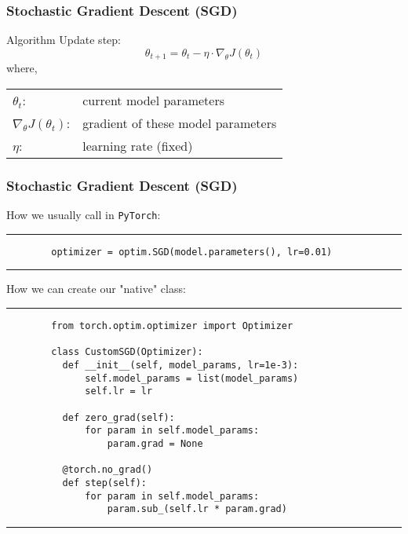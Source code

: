     \begin{frame}
      \frametitle{Stochastic Gradient Descent (SGD)} %
      \begin{block}{Algorithm}
        Update step:
        \begin{equation}
          \theta_{t+1} = \theta_{t} - \eta \cdot \nabla_{\theta}J(\theta_t)
        \end{equation}
        \vskip 0.3cm
        where, \\
        \begin{tabular}{l l}
          $\theta_{t}$: & current model parameters \\
          $\nabla_{\theta}J(\theta_t)$: & gradient of these model parameters \\
          $\eta$: & learning rate (fixed)
        \end{tabular}
        
      \end{block}
    \end{frame}


    \begin{frame}[fragile]
      \frametitle{Stochastic Gradient Descent (SGD)}
      \vspace{0.2cm}
      How we usually call in \verb|PyTorch|:
      \rule{\textwidth}{1pt}
      \scriptsize
      \begin{verbatim}
        optimizer = optim.SGD(model.parameters(), lr=0.01)
      \end{verbatim}
      \rule{\textwidth}{1pt}
      
      \normalsize
      \vspace{0.2cm}
      How we can create our "native" class:
      \rule{\textwidth}{1pt}
      \scriptsize
      \begin{verbatim}
        from torch.optim.optimizer import Optimizer
        
        class CustomSGD(Optimizer):
          def __init__(self, model_params, lr=1e-3):
              self.model_params = list(model_params)
              self.lr = lr

          def zero_grad(self):
              for param in self.model_params:
                  param.grad = None

          @torch.no_grad()
          def step(self):
              for param in self.model_params:
                  param.sub_(self.lr * param.grad)
      \end{verbatim}
      \rule{\textwidth}{1pt}
    \end{frame}

